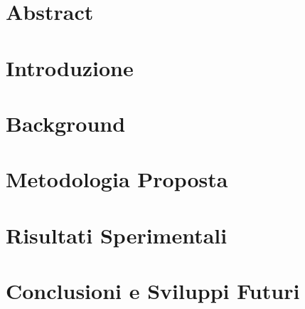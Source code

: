 \documentclass[12pt, a4paper, oneside, openright]{book}
\begin{document}
\frontmatter
 

\chapter*{Abstract}



\tableofcontents
\listoffigures

\mainmatter

\chapter{Introduzione}


\chapter{Background}


\chapter{Metodologia Proposta}


\chapter{Risultati Sperimentali}


\chapter{Conclusioni e Sviluppi Futuri}


\backmatter
\printbibliography[heading=bibintoc, title={Bibliografia}]
\end{document}
